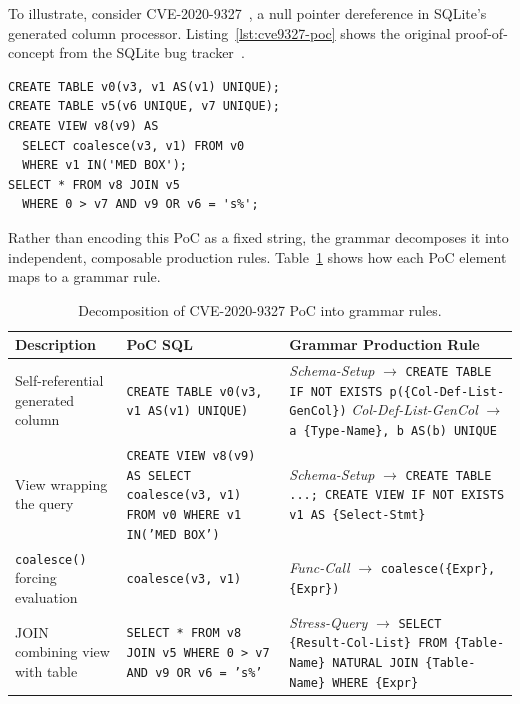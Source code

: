 To illustrate, consider CVE-2020-9327~\citep{cve20209327}, a null pointer dereference in SQLite's generated column processor. Listing~\ref{lst:cve9327-poc} shows the original proof-of-concept from the SQLite bug tracker~\citep{cve20209327ticket}.

\begin{lstlisting}[caption={Original PoC for CVE-2020-9327.}, label={lst:cve9327-poc}, basicstyle=\ttfamily\small, numbers=none, frame=single, xleftmargin=1cm, xrightmargin=1cm]
CREATE TABLE v0(v3, v1 AS(v1) UNIQUE);
CREATE TABLE v5(v6 UNIQUE, v7 UNIQUE);
CREATE VIEW v8(v9) AS
  SELECT coalesce(v3, v1) FROM v0
  WHERE v1 IN('MED BOX');
SELECT * FROM v8 JOIN v5
  WHERE 0 > v7 AND v9 OR v6 = 's%';
\end{lstlisting}

Rather than encoding this PoC as a fixed string, the grammar decomposes it into independent, composable production rules. Table~\ref{tab:poc-decomposition} shows how each PoC element maps to a grammar rule.

\begin{table}[htbp]
\caption{Decomposition of CVE-2020-9327 PoC into grammar rules.}
\label{tab:poc-decomposition}
\centering
\scriptsize
\begin{tabular}{>{\raggedright\arraybackslash}p{2.8cm}>{\raggedright\arraybackslash}p{4.2cm}>{\raggedright\arraybackslash}p{5.8cm}}
\toprule
\textbf{\footnotesize Description} & \textbf{\footnotesize PoC SQL} & \textbf{\footnotesize Grammar Production Rule} \\
\midrule
Self-referential generated column &
  \texttt{CREATE TABLE v0(v3, v1 AS(v1) UNIQUE)} &
  \textit{Schema-Setup} $\to$ \texttt{CREATE TABLE IF NOT EXISTS p(\{Col-Def-List-GenCol\})} \newline
  \textit{Col-Def-List-GenCol} $\to$ \texttt{a \{Type-Name\}, b AS(b) UNIQUE} \\
\midrule
View wrapping the query &
  \texttt{CREATE VIEW v8(v9) AS SELECT coalesce(v3, v1) FROM v0 WHERE v1 IN('MED BOX')} &
  \textit{Schema-Setup} $\to$ \texttt{CREATE TABLE ...; CREATE VIEW IF NOT EXISTS v1 AS \{Select-Stmt\}} \\
\midrule
\texttt{coalesce()} forcing evaluation &
  \texttt{coalesce(v3, v1)} &
  \textit{Func-Call} $\to$ \texttt{coalesce(\{Expr\}, \{Expr\})} \\
\midrule
JOIN combining view with table &
  \texttt{SELECT * FROM v8 JOIN v5 WHERE 0 > v7 AND v9 OR v6 = 's\%'} &
  \textit{Stress-Query} $\to$ \texttt{SELECT \{Result-Col-List\} FROM \{Table-Name\} NATURAL JOIN \{Table-Name\} WHERE \{Expr\}} \\
\bottomrule
\end{tabular}
\end{table}

